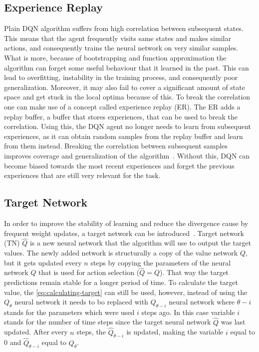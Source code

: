\documentclass{article}
\begin{document}
\subsection{Experience Replay}
\label{subsec:experience-replay}
Plain DQN algorithm suffers from high correlation between subsequent states.
This means that the agent frequently visits same states and makes similar actions,
and consequently trains the neural network on very similar samples.
What is more, because of bootstrapping and function approximation the algorithm can forget some useful behaviour that it learned in the past.
This can lead to overfitting, instability in the training process, and consequently poor generalization.
Moreover, it may also fail to cover a significant amount of state space and get stuck
in the local optima because of this.
To break the correlation one can make use of a concept called experience replay (ER).
The ER adds a replay buffer, a buffer that stores experiences, that can be used to break the correlation.
Using this, the DQN agent no longer needs to learn from subsequent experiences, as it can obtain random samples
from the replay buffer and learn from them instead.
Breaking the correlation between subsequent samples improves coverage and generalization of the algorithm~\cite{DBLP:books/sp/Plaat22}.
Without this, DQN can become biased towards the most recent experiences and forget the previous experiences
that are still very relevant for the task.

\subsection{Target Network}
\label{subsec:target-network}
In order to improve the stability of learning and reduce the divergence cause by frequent weight updates,
a target network can be introduced~\cite{DBLP:books/sp/Plaat22}.
Target network (TN) $\hat Q$ is a new neural network that the algorithm will use to output the target values.
The newly added network is structurally a copy of the value network $Q$, but it gets updated every $n$ steps
by copying the parameters of the neural network $Q$ that is used for action selection ($\hat Q = Q$).
That way the target predictions remain stable for a longer period of time.
To calculate the target value, the \autoref{eq:calculating-target} can still be used, however, instead of using the $Q_\theta$
neural network it needs to bo replaced with $Q_{\theta - i}$ neural network where $\theta - i$ stands for the parameters
which were used $i$ steps ago.
In this case variable $i$ stands for the number of time steps since the target neural network $\hat Q$ was last updated.
After every $n$ steps, the $\hat Q_{\theta - i}$ is updated, making the variable $i$ equal to 0 and $\hat Q_{\theta - i}$
equal to $Q_\theta$.
\end{document}
